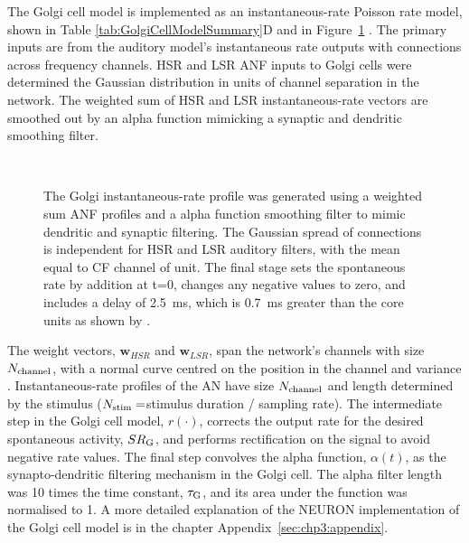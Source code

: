 % 

 The Golgi cell model is implemented as an instantaneous-rate Poisson rate
 model, shown in Table \ref{tab:GolgiCellModelSummary}D and in
 Figure~\ref{fig:GolgiDiagram} . The primary inputs are from the auditory
 model's instantaneous rate outputs with connections across frequency
 channels. HSR and LSR ANF inputs to Golgi cells were determined the Gaussian
 distribution in units of channel separation in the network. The weighted sum of
 HSR and LSR instantaneous-rate vectors are smoothed out by an alpha function
 mimicking a synaptic and dendritic smoothing filter.

 \begin{figure}[h!]
  \centering
  \\
  \caption{The Golgi instantaneous-rate profile was generated using a weighted
    sum ANF profiles and a alpha function smoothing filter to mimic dendritic
    and synaptic filtering. The Gaussian spread of connections is independent
    for HSR and LSR auditory filters, with the mean equal to CF channel of
    unit. The final stage sets the spontaneous rate by addition at t=0, changes
    any negative values to zero, and includes a delay of 2.5~ms, which is 0.7~ms
    greater than the core \VCN units as shown by \citet{GhoshalKim:1997}.}
  \label{fig:GolgiDiagram}
 \end{figure}


 The weight vectors, $\mathbf{w}_{HSR}$ and $\mathbf{w}_{LSR}$, span the
 network's channels with size $N_{\rm channel}$, with a normal curve centred on
 the position in the channel and variance \sANFGLG. Instantaneous-rate profiles
 of the AN have size $N_{\rm channel}$ and length determined by the stimulus
 ($N_{\rm stim}=$stimulus duration / sampling rate).  The intermediate step in
 the Golgi cell model, $r(\cdot)$, corrects the output rate for the desired
 spontaneous activity, $\protect SR_{\rm G}$, and performs rectification on the signal to
 avoid negative rate values.  The final step convolves the alpha function,
 $\alpha(t)$, as the synapto-dendritic filtering mechanism in the Golgi
 cell. The alpha filter length was 10 times the time constant, $\protect\tau_{\rm G}$, and its
 area under the function was normalised to 1.  A more detailed explanation of
 the NEURON implementation of the Golgi cell model is in the chapter
 Appendix~\ref{sec:chp3:appendix}.  %

